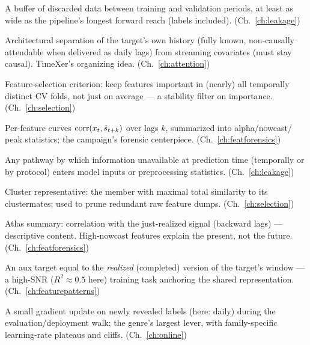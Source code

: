 \begin{description}[style=nextline, itemsep=2pt]
\item[Embargo] A buffer of discarded data between training and validation
periods, at least as wide as the pipeline's longest forward reach
(labels included). (Ch.~\ref{ch:leakage})

\item[Endogenous / exogenous split] Architectural separation of the
target's own history (fully known, non-causally attendable when
delivered as daily lags) from streaming covariates (must stay causal).
TimeXer's organizing idea. (Ch.~\ref{ch:attention})

\item[Fold-consistency (SHAP-consistency)] Feature-selection criterion:
keep features important in (nearly) all temporally distinct CV folds,
not just on average --- a stability filter on importance.
(Ch.~\ref{ch:selection})

\item[Lead--lag atlas] Per-feature curves
$\operatorname{corr}(x_t, \hat s_{t+k})$ over lags $k$, summarized into alpha/nowcast/
peak statistics; the campaign's forensic centerpiece.
(Ch.~\ref{ch:featforensics})

\item[Leakage] Any pathway by which information unavailable at prediction
time (temporally or by protocol) enters model inputs or preprocessing
statistics. (Ch.~\ref{ch:leakage})

\item[Medoid] Cluster representative: the member with maximal total
similarity to its clustermates; used to prune redundant raw feature
dumps. (Ch.~\ref{ch:selection})

\item[Nowcast score] Atlas summary: correlation with the just-realized
signal (backward lags) --- descriptive content. High-nowcast features
explain the present, not the future. (Ch.~\ref{ch:featforensics})

\item[Nowcast auxiliary head] An aux target equal to the
\emph{realized} (completed) version of the target's window --- a
high-SNR ($R^2 \approx 0.5$ here) training task anchoring the shared
representation. (Ch.~\ref{ch:featurepatterns})

\item[Online refit] A small gradient update on newly revealed labels
(here: daily) during the evaluation/deployment walk; the genre's
largest lever, with family-specific learning-rate plateaus and cliffs.
(Ch.~\ref{ch:online})


\end{description}
